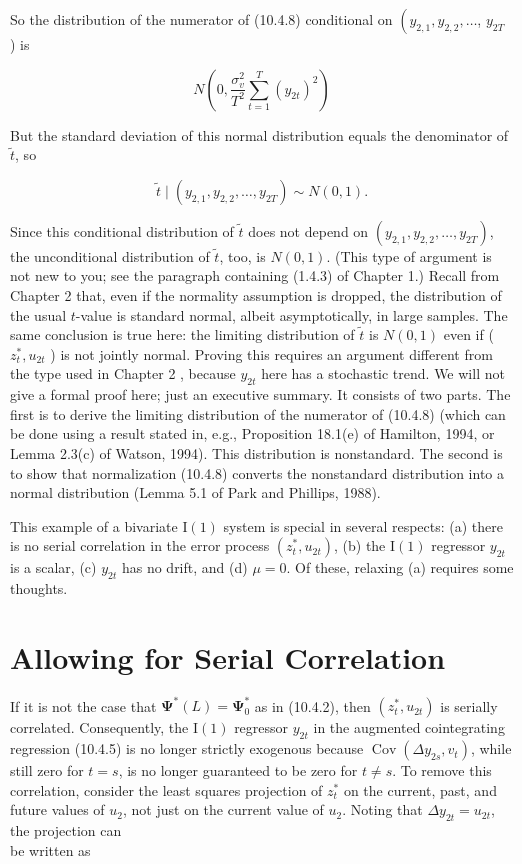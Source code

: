 \documentclass[10pt]{article}
\begin{document}
So the distribution of the numerator of (10.4.8) conditional on $\left(y_{2,1}, y_{2,2}, \ldots\right.$, $y_{2 T}$ ) is

$$
N\left(0, \frac{\sigma_{v}^{2}}{T^{2}} \sum_{t=1}^{T}\left(y_{2 t}\right)^{2}\right)
$$

But the standard deviation of this normal distribution equals the denominator of $\tilde{t}$, so

$$
\tilde{t} \mid\left(y_{2,1}, y_{2,2}, \ldots, y_{2 T}\right) \sim N(0,1) .
$$

Since this conditional distribution of $\tilde{t}$ does not depend on $\left(y_{2,1}, y_{2,2}, \ldots, y_{2 T}\right)$, the unconditional distribution of $\tilde{t}$, too, is $N(0,1)$. (This type of argument is not new to you; see the paragraph containing (1.4.3) of Chapter 1.) Recall from Chapter 2 that, even if the normality assumption is dropped, the distribution of the usual $t$-value is standard normal, albeit asymptotically, in large samples. The same conclusion is true here: the limiting distribution of $\tilde{t}$ is $N(0,1)$ even if ( $z_{t}^{*}, u_{2 t}$ ) is not jointly normal. Proving this requires an argument different from the type used in Chapter 2 , because $y_{2 t}$ here has a stochastic trend. We will not give a formal proof here; just an executive summary. It consists of two parts. The first is to derive the limiting distribution of the numerator of (10.4.8) (which can be done using a result stated in, e.g., Proposition 18.1(e) of Hamilton, 1994, or Lemma 2.3(c) of Watson, 1994). This distribution is nonstandard. The second is to show that normalization (10.4.8) converts the nonstandard distribution into a normal distribution (Lemma 5.1 of Park and Phillips, 1988).

This example of a bivariate $\mathrm{I}(1)$ system is special in several respects: (a) there is no serial correlation in the error process $\left(z_{t}^{*}, u_{2 t}\right)$, (b) the $\mathrm{I}(1)$ regressor $y_{2 t}$ is a scalar, (c) $y_{2 t}$ has no drift, and (d) $\mu=0$. Of these, relaxing (a) requires some thoughts.

\section*{Allowing for Serial Correlation}
If it is not the case that $\boldsymbol{\Psi}^{*}(L)=\boldsymbol{\Psi}_{0}^{*}$ as in (10.4.2), then $\left(z_{t}^{*}, u_{2 t}\right)$ is serially correlated. Consequently, the $\mathrm{I}(1)$ regressor $y_{2 t}$ in the augmented cointegrating regression (10.4.5) is no longer strictly exogenous because $\operatorname{Cov}\left(\Delta y_{2 s}, v_{t}\right)$, while still zero for $t=s$, is no longer guaranteed to be zero for $t \neq s$. To remove this correlation, consider the least squares projection of $z_{t}^{*}$ on the current, past, and future values of $u_{2}$, not just on the current value of $u_{2}$. Noting that $\Delta y_{2 t}=u_{2 t}$, the projection can\\
be written as
\end{document}
